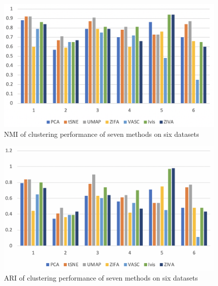 \begin{figure}[htb!]
    \centering
    \includegraphics[width=1\textwidth]{figures/myfigures/nmiallf.png}
    \caption{NMI of clustering performance of seven methods on six datasets}
    \label{nmiallf}
\end{figure}

\begin{figure}[htb!]
    \centering
    \includegraphics[width=1\textwidth]{figures/myfigures/ariallf.png}
    \caption{ARI of clustering performance of seven methods on six datasets}
    \label{ariallf}
\end{figure}


